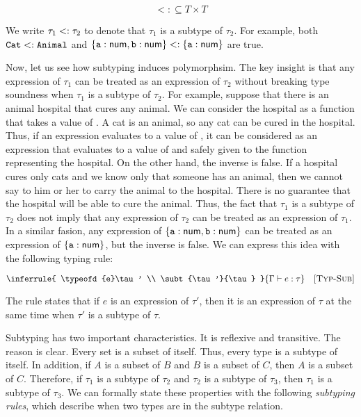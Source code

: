 \[ <:\subseteq T\times T \]

We write $\tau_1<:\tau_2$ to denote that $\tau_1$ is a subtype of
$\tau_2$. For example, both $\texttt{Cat}<:\texttt{Animal}$ and
$\{\texttt{a}:\textsf{num},\texttt{b}:\textsf{num}\}<:\{\texttt{a}:\textsf{num}\}$ are true.

Now, let us see how subtyping induces polymorphsim. The key insight is that
any expression of $\tau_1$ can be treated as an expression of $\tau_2$ without
breaking type soundness when $\tau_1$ is a subtype of $\tau_2$. For example,
suppose that there is an animal hospital that cures any animal. We can consider
the hospital as a function that takes a value of . A cat is an
animal, so any cat can be cured in the hospital. Thus, if an expression
evaluates to a value of , it can be considered as an expression
that evaluates to a value of  and safely given to the function
representing the hospital. On the other hand, the inverse is false. If a hospital
cures only cats and we know only that someone has an animal, then we cannot say
to him or her to carry the animal to the hospital. There is no guarantee that
the hospital will be able to cure the animal. Thus, the fact that $\tau_1$ is a
subtype of $\tau_2$ does not imply that any expression of $\tau_2$ can be treated
as an expression of $\tau_1$. In a similar fasion, any expression of
$\{\texttt{a}:\textsf{num},\texttt{b}:\textsf{num}\}$ can be treated as an expression of ${\{\texttt{a}:\textsf{num}\}}$,
but the inverse is false. We can express this idea with the following typing
rule:


\vspace{-1em}

\[
  \inferrule
  { \typeofd{e}\tau' \\ \subt{\tau'}{\tau} }
  { \typeofd{e}\tau }
  \quad\textsc{[Typ-Sub]}
\]

The rule states that if $e$ is an expression of $\tau'$, then it is an
expression of $\tau$ at the same time when $\tau'$ is a subtype of $\tau$.

Subtyping has two important characteristics. It is reflexive and transitive.
The reason is clear. Every set is a subset of itself. Thus, every type is a
subtype of itself. In addition, if $A$ is a subset of $B$ and $B$ is a subset of
$C$, then $A$ is a subset of $C$. Therefore, if $\tau_1$ is a subtype of
$\tau_2$ and $\tau_2$ is a subtype of $\tau_3$, then $\tau_1$ is a subtype of
$\tau_3$. We can formally state these properties with the following
\textit{subtyping rules}, which describe when two types
are in the subtype relation.

